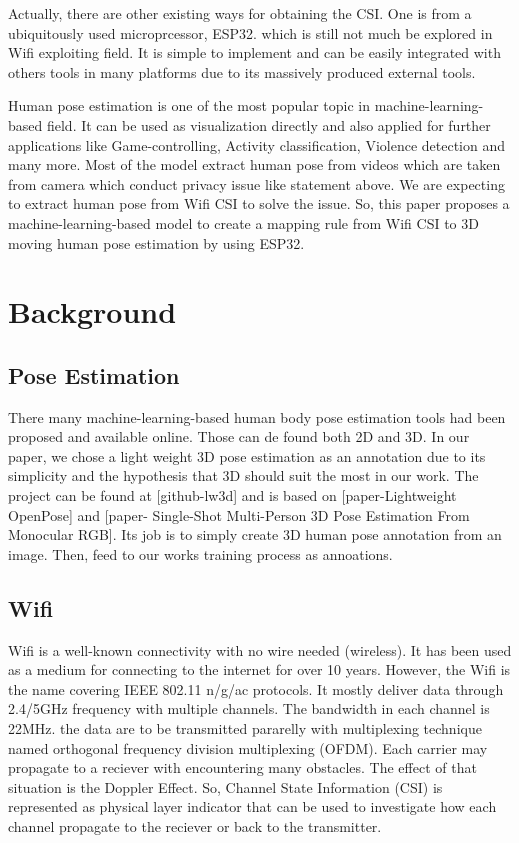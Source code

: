 \documentclass[10pt,letterpaper]{article}
\begin{document}
Actually, there are other existing ways for obtaining the CSI. One is from a ubiquitously used microprcessor, ESP32. which is still not much be explored in Wifi exploiting field. It is simple to implement and can be easily integrated with others tools in many platforms due to its massively produced external tools. 

Human pose estimation is one of the most popular topic in machine-learning-based field. It can be used as visualization directly and also applied for further applications like Game-controlling, Activity classification, Violence detection and many more. Most of the model extract human pose from videos which are taken from camera which conduct privacy issue like statement above. We are expecting to extract human pose from Wifi CSI to solve the issue. So, this paper proposes a machine-learning-based model to create a mapping rule from Wifi CSI to 3D moving human pose estimation by using ESP32.


\section*{Background}

\subsection*{Pose Estimation}

There many machine-learning-based human body pose estimation tools had been proposed and available online. Those can de found both 2D and 3D. In our paper, we chose a light weight 3D pose estimation as an annotation due to its simplicity and the hypothesis that 3D should suit the most in our work. The project can be found at [github-lw3d] and is based on [paper-Lightweight OpenPose] and [paper- Single-Shot Multi-Person 3D Pose Estimation From Monocular RGB]. Its job is to simply create 3D human pose annotation from an image. Then, feed to our works training process as annoations.


\subsection*{Wifi}\label{wifi}

Wifi is a well-known connectivity with no wire needed (wireless). It has been used as a medium for connecting to the internet for over 10 years. However, the Wifi is the name covering IEEE 802.11 n/g/ac protocols. It mostly deliver data through 2.4/5GHz frequency with multiple channels. The bandwidth in each channel is 22MHz. the data are to be transmitted  pararelly with multiplexing technique named orthogonal frequency division multiplexing (OFDM). Each carrier may propagate to a reciever with encountering many obstacles. The effect of that situation is the Doppler Effect.
So, Channel State Information (CSI) is represented as physical layer indicator that can be used to investigate how each channel propagate to the reciever or back to the transmitter.
\end{document}

